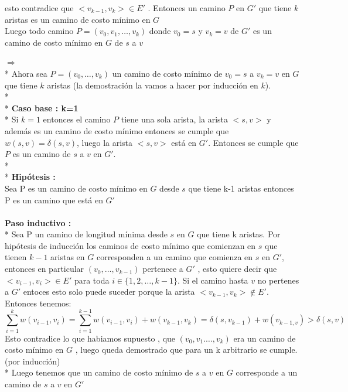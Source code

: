 \documentclass{article}
\begin{document}
    \noindent esto contradice que $<v_{k-1}, v_{k}> \in E'$ . Entonces un camino $P$  en $G'$ que tiene $k$ aristas es un camino de costo m\'inimo en $G$ 
    \\
    Luego todo camino $P = \left(v_0,v_1,\dots , v_k \right)$ donde $v_{0}=s$ y $v_{k}=v$ de $G'$ es un camino  de costo m\'inimo en $G$ de $s$ a $v$ 
    
    \vspace*{0.5cm} 

    \noindent $\Longrightarrow $
    \\*
    Ahora sea $P = \left(v_0,\dots,v_k \right)$ un camino de costo m\'inimo de $v_0 = s $ a  $v_k = v$ en $G$ que tiene $k$ aristas (la demostraci\'on la vamos a hacer por inducci\'on en $k$).
    \\*
    \\*
    \noindent \textbf{Caso base : k=1}
    \\*
    Si $k=1$ entonces el camino $P$ tiene una sola arista, la arista $<s,v>$ y adem\'as es un camino de costo m\'inimo entonces se cumple que $w\left(s,v\right) = \delta\left(s,v\right)$, luego la 
    arista $<s,v>$ est\'a en $G'$. Entonces se cumple que $P$ es un camino de $s$ a $v$ en $G'$.  
    \\*
    \\*
    \noindent \textbf{Hip\'otesis : }\\
    Sea P es un camino de costo m\'inimo en $G$ desde $s$ que tiene k-1 aristas entonces P es un camino que est\'a en $G'$\\ \\
    \noindent \textbf{Paso inductivo :}
    \\*
    Sea P un camino de longitud m\'inima desde $s$ en $G$ que tiene k aristas.
    Por hip\'otesis de inducci\'on los caminos de costo m\'inimo que comienzan en $s$  que tienen $k-1$ aristas en $G$ corresponden a un camino que comienza en $s$ en $G'$, entonces en particular  $\left(v_0,\dots,v_{k-1}\right)$
    pertenece a $G'$ , esto quiere decir que $<v_{i-1},v_i> \in E'$ para toda $i \in \{1,2,\dots, k-1\}$. Si el camino hasta $v$ no pertenes a $G'$ entoces esto solo puede suceder porque la arista  $<v_{k-1}, v_{k}> \notin E'$. Entonces tenemos:
    \begin{equation*}
        \sum_{i=1}^{k} w\left(v_{i-1},v_{i}\right) = \sum_{i=1}^{k-1} w\left(v_{i-1},v_{i}\right) + w\left(v_{k-1} , v_{k}\right) = \delta\left(s,v_{k-1}\right) + w\left(v_{k-1, v}\right) > \delta\left(s, v\right)
    \end{equation*}
    \noindent Esto contradice lo que habiamos supuesto , que $\left(v_0,v_1.\dots, v_k\right)$ era un camino de costo m\'inimo en $G$ , luego queda demostrado que para un k arbitrario se cumple. (por inducci\'on)
    \\*
    Luego tenemos que un camino de costo m\'inimo de $s$ a $v$ en $G$ corresponde a un camino de $s$ a $v$ en $G'$ 
    
\end{document}
